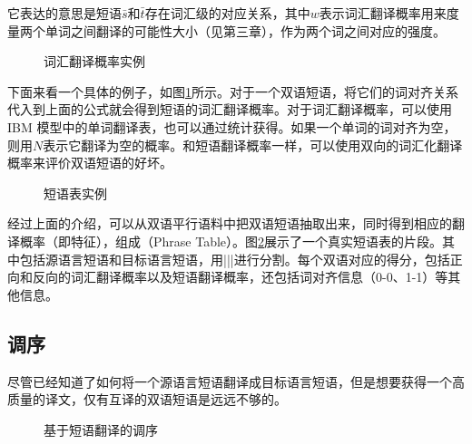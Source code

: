 \parinterval 它表达的意思是短语$\bar{s}$和$\bar{t}$存在词汇级的对应关系，其中$w$表示词汇翻译概率用来度量两个单词之间翻译的可能性大小（见第三章），作为两个词之间对应的强度。

\begin{figure}[htp]
\centering

\caption{词汇翻译概率实例}
\label{fig:4-17}
\end{figure}

\parinterval 下面来看一个具体的例子，如图\ref{fig:4-17}所示。对于一个双语短语，将它们的词对齐关系代入到上面的公式就会得到短语的词汇翻译概率。对于词汇翻译概率，可以使用IBM 模型中的单词翻译表，也可以通过统计获得\cite{koehn2002learning}。如果一个单词的词对齐为空，则用$N$表示它翻译为空的概率。和短语翻译概率一样，可以使用双向的词汇化翻译概率来评价双语短语的好坏。

\begin{figure}[htp]
\centering

\caption{短语表实例}
\label{fig:4-18}
\end{figure}

\parinterval 经过上面的介绍，可以从双语平行语料中把双语短语抽取出来，同时得到相应的翻译概率（即特征），组成{\small{}}（Phrase Table）。图\ref{fig:4-18}展示了一个真实短语表的片段。其中包括源语言短语和目标语言短语，用|||进行分割。每个双语对应的得分，包括正向和反向的词汇翻译概率以及短语翻译概率，还包括词对齐信息（0-0、1-1）等其他信息。


\subsection{调序}\label{subsection-4.2.4}

\parinterval 尽管已经知道了如何将一个源语言短语翻译成目标语言短语，但是想要获得一个高质量的译文，仅有互译的双语短语是远远不够的。

\begin{figure}[htp]
\centering

\caption{基于短语翻译的调序}
\label{fig:4-19}
\end{figure}

